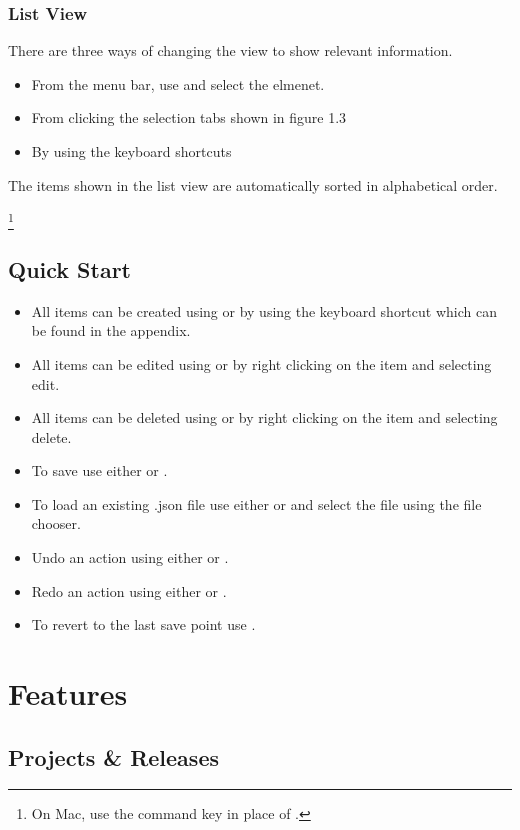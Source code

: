 \documentclass[11pt,fleqn]{book} %
\begin{document}
\subsection{List View}
There are three ways of changing the view to show relevant information.
\begin{itemize}
  \item From the menu bar, use  and select the elmenet.
  \item From clicking the selection tabs shown in figure 1.3
  \item By using the keyboard shortcuts 
\end{itemize}
The items shown in the list view are automatically sorted in alphabetical order.

\footnote{On Mac, use the command key \keys{\cmd} in place of \keys{\ctrl}.}

\section{Quick Start}
\begin{itemize}
    \item All items can be created using  or by using the keyboard shortcut which can be found
    in the appendix.
    \item All items can be edited using  or by right clicking on the item and selecting edit.
    \item All items can be deleted using  or by right clicking on the item and selecting delete.
    \item To save use either  or .
    \item To load an existing .json file use either  or  and select the file using the file chooser.
    \item Undo an action using either  or .
    \item Redo an action using either  or .
    \item To revert to the last save point use .
\end{itemize}

\chapter{Features}
\section{Projects \& Releases}
\end{document}
